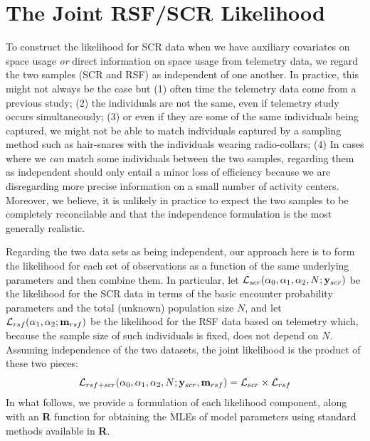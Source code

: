\documentclass[12pt]{article}
\begin{document}
\section{The Joint RSF/SCR Likelihood}

To construct the likelihood for SCR data when we have auxiliary
covariates on space usage {\it or} direct information on space usage
from telemetry data, we regard the two samples (SCR and RSF) as
independent of one another. In practice, this might not always be the
case but (1) often time the telemetry data come from a previous study;
(2) the individuals are not the same, even if telemetry study occurs simultaneously; (3) or even if they are
some of the same individuals being captured, we might not be able to
match individuals captured by a sampling method such as hair-snares
with the individuals wearing radio-collars; (4) In cases where we {\it
  can} match some individuals between the two samples, regarding them as
independent should only entail a minor
loss of efficiency
because we are disregarding more precise information on a small number
of activity centers. Moreover, we believe, it is unlikely in practice
to expect the two samples to be completely reconcilable and that the
independence formulation is the most generally realistic.

Regarding the two data sets as being independent, our approach here
is to form the likelihood for each set of observations as a function
of the same underlying parameters and then combine them. In
particular, let ${\cal L}_{scr}(\alpha_{0}, \alpha_{1}, \alpha_{2}, N;
{\bf y}_{scr})$
be the likelihood for the SCR data in terms of the basic encounter  
probability parameters and the total (unknown) population size $N$,
and let ${\cal L}_{rsf}(\alpha_{1},\alpha_{2}; {\bf m}_{rsf})$ be the
likelihood for the RSF data based on telemetry which, because the
sample size of such individuals is fixed, does not depend on $N$.
Assuming independence of the two datasets, the
joint likelihood is the product of these two pieces:
\[
{\cal L}_{rsf+scr}(\alpha_{0},\alpha_{1},\alpha_{2},N; {\bf y}_{scr},{\bf
  m}_{rsf})  = {\cal L}_{scr} \times {\cal L}_{rsf}
\]
In what follows, we provide a formulation of each likelihood
component, along with an {\bf R} function for obtaining the MLEs of
model parameters using standard methods available in {\bf R}.
\end{document}
